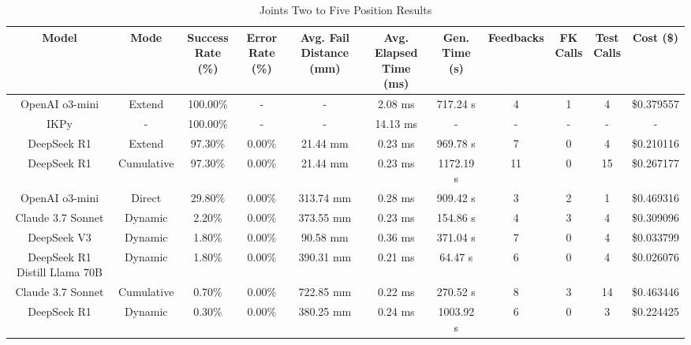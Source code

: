 \begin{landscape}
\begin{table}[H]
\tiny
\renewcommand{\arraystretch}{1.2}
\caption{Joints Two to Five Position Results}
\begin{center}
\begin{tabular}{|c|c|c|c|c|c|c|c|c|c|c|}
    \hline
    \textbf{Model} & 
    \textbf{Mode} & 
    \makecell{\textbf{Success}\\\textbf{Rate (\%)}} &
    \makecell{\textbf{Error}\\\textbf{Rate (\%)}} &
    \makecell{\textbf{Avg. Fail}\\\textbf{Distance (mm)}} &
    \makecell{\textbf{Avg. Elapsed}\\\textbf{Time (ms)}} &
    \makecell{\textbf{Gen.}\\\textbf{Time (s)}} &
    \textbf{Feedbacks} &
    \makecell{\textbf{FK}\\\textbf{Calls}} &
    \makecell{\textbf{Test}\\\textbf{Calls}} &
    \textbf{Cost (\$)} \\
    \hline
    OpenAI o3-mini & Extend & 100.00\% & - & - & 2.08 ms & 717.24 s & 4 & 1 & 4 & \$0.379557 \\
    \hline
    IKPy & - & 100.00\% & - & - & 14.13 ms & - & - & - & - & - \\
    \hline
    DeepSeek R1 & Extend & 97.30\% & 0.00\% & 21.44 mm & 0.23 ms & 969.78 s & 7 & 0 & 4 & \$0.210116 \\
    \hline
    DeepSeek R1 & Cumulative & 97.30\% & 0.00\% & 21.44 mm & 0.23 ms & 1172.19 s & 11 & 0 & 15 & \$0.267177 \\
    \hline
    OpenAI o3-mini & Direct & 29.80\% & 0.00\% & 313.74 mm & 0.28 ms & 909.42 s & 3 & 2 & 1 & \$0.469316 \\
    \hline
    Claude 3.7 Sonnet & Dynamic & 2.20\% & 0.00\% & 373.55 mm & 0.23 ms & 154.86 s & 4 & 3 & 4 & \$0.309096 \\
    \hline
    DeepSeek V3 & Dynamic & 1.80\% & 0.00\% & 90.58 mm & 0.36 ms & 371.04 s & 7 & 0 & 4 & \$0.033799 \\
    \hline
    DeepSeek R1 Distill Llama 70B & Dynamic & 1.80\% & 0.00\% & 390.31 mm & 0.21 ms & 64.47 s & 6 & 0 & 4 & \$0.026076 \\
    \hline
    Claude 3.7 Sonnet & Cumulative & 0.70\% & 0.00\% & 722.85 mm & 0.22 ms & 270.52 s & 8 & 3 & 14 & \$0.463446 \\
    \hline
    DeepSeek R1 & Dynamic & 0.30\% & 0.00\% & 380.25 mm & 0.24 ms & 1003.92 s & 6 & 0 & 3 & \$0.224425 \\

\end{tabular}
\end{center}
\end{table}
\end{landscape}
